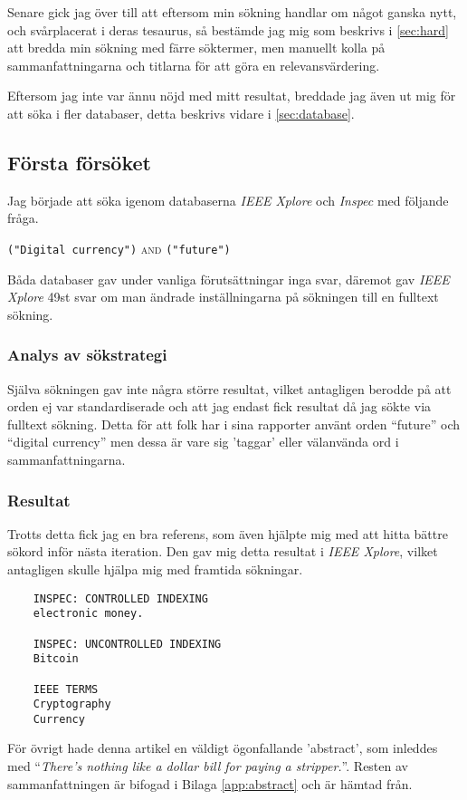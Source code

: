\documentclass[a4paper,11pt,exjobb]{kth-mag}
\begin{document}
Senare gick jag över till att eftersom min sökning handlar om något ganska nytt, och svårplacerat i deras tesaurus, så bestämde jag mig som beskrivs i \ref{sec:hard} att bredda min sökning med färre söktermer, men manuellt kolla på sammanfattningarna och titlarna för att göra en relevansvärdering.

Eftersom jag inte var ännu nöjd med mitt resultat, breddade jag även ut mig för att söka i fler databaser, detta beskrivs vidare i \ref{sec:database}.
\newpage
\subsection{Första försöket}
\label{sec:first}
Jag började att söka igenom databaserna \textit{IEEE Xplore} och \textit{Inspec} med följande fråga.
\begin{center}
\verb#("Digital currency")# \textsc{and} \verb#("future")#
\end{center}
Båda databaser gav under vanliga förutsättningar inga svar, däremot gav \textit{IEEE Xplore} 49st svar om man ändrade inställningarna på sökningen till en fulltext sökning.

\subsubsection{Analys av sökstrategi}
Själva sökningen gav inte några större resultat, vilket antagligen berodde på att orden ej var standardiserade och att jag endast fick resultat då jag sökte via fulltext sökning. Detta för att folk har i sina rapporter använt orden ``future'' och ``digital currency'' men dessa är vare sig 'taggar' eller välanvända ord i sammanfattningarna.

\subsubsection{Resultat}
Trotts detta fick jag en bra referens\cite{first}, som även hjälpte mig med att hitta bättre sökord inför nästa iteration. 
Den gav mig detta resultat i \textit{IEEE Xplore}, vilket antagligen skulle hjälpa mig med framtida sökningar. 
\begin{verbatim}
    INSPEC: CONTROLLED INDEXING
    electronic money.

    INSPEC: UNCONTROLLED INDEXING
    Bitcoin

    IEEE TERMS
    Cryptography
    Currency
\end{verbatim}


För övrigt hade  denna artikel en väldigt ögonfallande 'abstract', som inleddes med ``\textit{There's nothing like a dollar bill for paying a stripper.}''. Resten av sammanfattningen är bifogad i Bilaga \ref{app:abstract} och är hämtad från\cite{first}.
\end{document}
